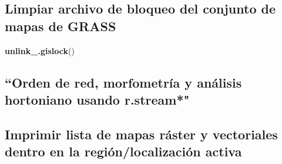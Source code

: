 \documentclass[11pt,]{article}
\newenvironment{Shaded}{\begin{snugshade}}{\end{snugshade}}
\newcommand{\KeywordTok}[1]{\textcolor[rgb]{0.13,0.29,0.53}{\textbf{#1}}}
\newcommand{\DataTypeTok}[1]{\textcolor[rgb]{0.13,0.29,0.53}{#1}}
\newcommand{\StringTok}[1]{\textcolor[rgb]{0.31,0.60,0.02}{#1}}
\newcommand{\OtherTok}[1]{\textcolor[rgb]{0.56,0.35,0.01}{#1}}
\newcommand{\OperatorTok}[1]{\textcolor[rgb]{0.81,0.36,0.00}{\textbf{#1}}}
\newcommand{\NormalTok}[1]{#1}
\begin{document}
\subsection{Limpiar archivo de bloqueo del conjunto de mapas de
GRASS}\label{limpiar-archivo-de-bloqueo-del-conjunto-de-mapas-de-grass}

\begin{Shaded}
\begin{Highlighting}[]
\KeywordTok{unlink_.gislock}\NormalTok{()}
\end{Highlighting}
\end{Shaded}

\subsection{``Orden de red, morfometría y análisis hortoniano usando
r.stream*"}\label{orden-de-red-morfometruxeda-y-anuxe1lisis-hortoniano-usando-r.stream}

\begin{Shaded}
\end{Shaded}

\subsection{}\label{section}

\begin{Shaded}
\end{Shaded}

\subsection{Imprimir lista de mapas ráster y vectoriales dentro en la
región/localización
activa}\label{imprimir-lista-de-mapas-ruxe1ster-y-vectoriales-dentro-en-la-regiuxf3nlocalizaciuxf3n-activa}
\end{document}
